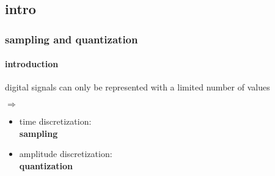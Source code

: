 \subsection{intro}
\begin{frame}\frametitle{sampling and quantization}\framesubtitle{introduction}
	digital signals can only be represented with a limited number of values
	\pause
	
	$\Rightarrow$
	\begin{itemize}
		\item	time discretization:\\ \textbf{sampling}
		\item	amplitude discretization:\\ \textbf{quantization}
	\end{itemize}
\end{frame}
